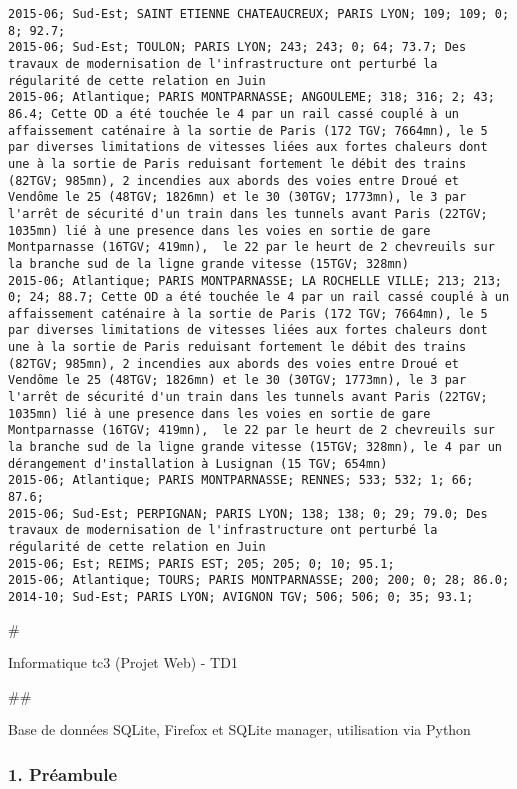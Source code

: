 \documentclass{article}
\begin{document}
\begin{Verbatim}[commandchars=\\\{\}]
2015-06; Sud-Est; SAINT ETIENNE CHATEAUCREUX; PARIS LYON; 109; 109; 0; 8; 92.7; 
2015-06; Sud-Est; TOULON; PARIS LYON; 243; 243; 0; 64; 73.7; Des travaux de modernisation de l'infrastructure ont perturbé la régularité de cette relation en Juin
2015-06; Atlantique; PARIS MONTPARNASSE; ANGOULEME; 318; 316; 2; 43; 86.4; Cette OD a été touchée le 4 par un rail cassé couplé à un affaissement caténaire à la sortie de Paris (172 TGV; 7664mn), le 5 par diverses limitations de vitesses liées aux fortes chaleurs dont une à la sortie de Paris reduisant fortement le débit des trains (82TGV; 985mn), 2 incendies aux abords des voies entre Droué et Vendôme le 25 (48TGV; 1826mn) et le 30 (30TGV; 1773mn), le 3 par l'arrêt de sécurité d'un train dans les tunnels avant Paris (22TGV; 1035mn) lié à une presence dans les voies en sortie de gare Montparnasse (16TGV; 419mn),  le 22 par le heurt de 2 chevreuils sur la branche sud de la ligne grande vitesse (15TGV; 328mn)
2015-06; Atlantique; PARIS MONTPARNASSE; LA ROCHELLE VILLE; 213; 213; 0; 24; 88.7; Cette OD a été touchée le 4 par un rail cassé couplé à un affaissement caténaire à la sortie de Paris (172 TGV; 7664mn), le 5 par diverses limitations de vitesses liées aux fortes chaleurs dont une à la sortie de Paris reduisant fortement le débit des trains (82TGV; 985mn), 2 incendies aux abords des voies entre Droué et Vendôme le 25 (48TGV; 1826mn) et le 30 (30TGV; 1773mn), le 3 par l'arrêt de sécurité d'un train dans les tunnels avant Paris (22TGV; 1035mn) lié à une presence dans les voies en sortie de gare Montparnasse (16TGV; 419mn),  le 22 par le heurt de 2 chevreuils sur la branche sud de la ligne grande vitesse (15TGV; 328mn), le 4 par un dérangement d'installation à Lusignan (15 TGV; 654mn)
2015-06; Atlantique; PARIS MONTPARNASSE; RENNES; 533; 532; 1; 66; 87.6; 
2015-06; Sud-Est; PERPIGNAN; PARIS LYON; 138; 138; 0; 29; 79.0; Des travaux de modernisation de l'infrastructure ont perturbé la régularité de cette relation en Juin
2015-06; Est; REIMS; PARIS EST; 205; 205; 0; 10; 95.1; 
2015-06; Atlantique; TOURS; PARIS MONTPARNASSE; 200; 200; 0; 28; 86.0; 
2014-10; Sud-Est; PARIS LYON; AVIGNON TGV; 506; 506; 0; 35; 93.1;
    \end{Verbatim}

    \#

Informatique tc3 (Projet Web) - TD1

    \#\#

Base de données SQLite, Firefox et SQLite manager, utilisation via
Python

    \subsubsection{1. Préambule}\label{pruxe9ambule}
\end{document}
